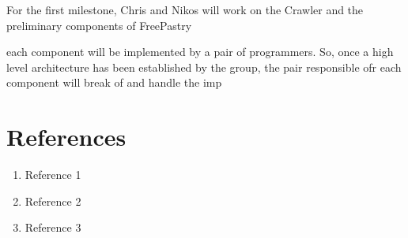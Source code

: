 \documentclass[11pt, twocolumn]{article}
\begin{document}
For the first milestone, Chris and Nikos will work on the Crawler and the preliminary components of FreePastry

 each component will be implemented by a pair of programmers.  So, once a high level architecture has been established by the group, the pair responsible ofr each component will break of and handle the imp



\section{References}

\begin{enumerate}
\item Reference 1
\item Reference 2
\item Reference 3
\end{enumerate}
\end{document}
